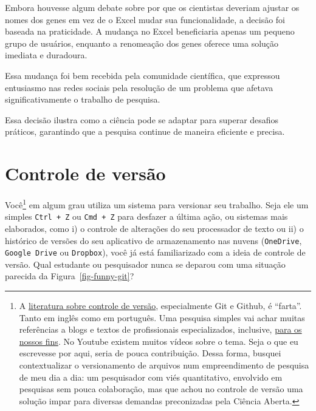 \documentclass[
  a4paper,
]{article}
\begin{document}
\begin{tcolorbox}
Embora houvesse algum debate sobre por que os cientistas deveriam
ajustar os nomes dos genes em vez de o Excel mudar sua funcionalidade, a
decisão foi baseada na praticidade. A mudança no Excel beneficiaria
apenas um pequeno grupo de usuários, enquanto a renomeação dos genes
oferece uma solução imediata e duradoura.

Essa mudança foi bem recebida pela comunidade científica, que expressou
entusiasmo nas redes sociais pela resolução de um problema que afetava
significativamente o trabalho de pesquisa.

Essa decisão ilustra como a ciência pode se adaptar para superar
desafios práticos, garantindo que a pesquisa continue de maneira
eficiente e precisa.

\end{tcolorbox}


\section{Controle de versão}\label{sec-git}

Você\footnote{A \href{https://git-scm.com/book/en/v2}{literatura sobre
  controle de versão}, especialmente Git e Github, é ``farta''. Tanto em
  inglês como em português. Uma pesquisa simples vai achar muitas
  referências a blogs e textos de profissionais especializados,
  inclusive, \href{https://happygitwithr.com/}{para os nossos fins}. No
  Youtube existem muitos vídeos sobre o tema. Seja o que eu escrevesse
  por aqui, seria de pouca contribuição. Dessa forma, busquei
  contextualizar o versionamento de arquivos num empreendimento de
  pesquisa de meu dia a dia: um pesquisador com viés quantitativo,
  envolvido em pesquisas sem pouca colaboração, mas que achou no
  controle de versão uma solução impar para diversas demandas
  preconizadas pela Ciência Aberta.} em algum grau utiliza um sistema
para versionar seu trabalho. Seja ele um simples \texttt{Ctrl\ +\ Z} ou
\texttt{Cmd\ +\ Z} para desfazer a última ação, ou sistemas mais
elaborados, como i) o controle de alterações do seu processador de texto
ou ii) o histórico de versões do seu aplicativo de armazenamento nas
nuvens (\texttt{OneDrive}, \texttt{Google\ Drive} ou \texttt{Dropbox}),
você já está familiarizado com a ideia de controle de versão. Qual
estudante ou pesquisador nunca se deparou com uma situação parecida da
Figura~\ref{fig-funny-git}?
\end{document}
